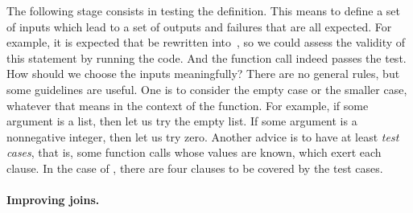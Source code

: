 The following stage consists in testing the definition. This means to
define a set of inputs which lead to a set of outputs and failures
that are all expected. For example, it is expected that
 be rewritten into~\erlcode{[]}, so we could
assess the validity of this statement by running the code. And the
function call indeed passes the test. How should we choose the inputs
meaningfully? There are no general rules, but some guidelines are
useful. One is to consider the empty case or the smaller case,
whatever that means in the context of the function. For example, if
some argument is a list, then let us try the empty list. If some
argument is a nonnegative integer, then let us try zero. Another
advice is to have at least \emph{test cases}, that is, some function
calls whose values are known, which exert each clause. In the case of
, there are four clauses to be covered by the test
cases.

\medskip

\paragraph{Improving joins.}

